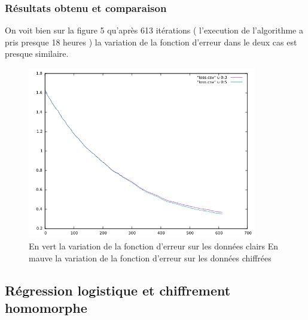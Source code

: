 \documentclass[a4paper,12pt]{article}
\begin{document}
  \subsubsection{Résultats obtenu et comparaison}
  On voit bien sur la figure 5 qu'après 613 itérations ( l'execution de l'algorithme a pris presque 18 heures ) la variation de la fonction d'erreur dans le deux cas est presque similaire.  
  \begin{figure}[h!]\begin{center}
    \includegraphics[width=10cm]{loss_linear_regression.png}
    \caption{En vert la variation de la fonction d'erreur sur les données clairs\newline
            En mauve la variation de la fonction d'erreur sur les données chiffrées}

    \label{fig:loss_linear}
  \end{center}
  \end{figure}
\newpage
  \subsection{Régression logistique et chiffrement homomorphe}
\end{document}
